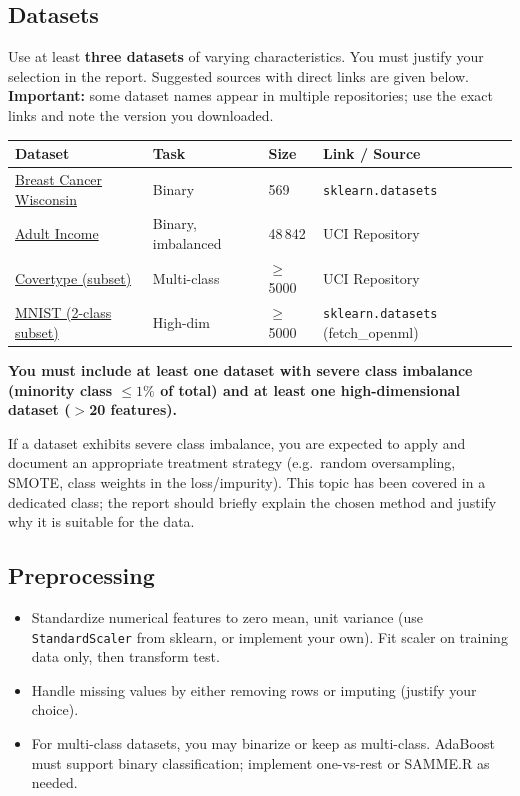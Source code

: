 \documentclass[11pt,a4paper]{article}
\newcommand{\warn}[1]{\textcolor{accent2}{\textbf{#1}}}
\begin{document}
\subsection{Datasets}
Use at least \textbf{three datasets} of varying characteristics. You must justify your selection in the report. Suggested sources with direct links are given below. \textbf{Important:} some dataset names appear in multiple repositories; use the exact links and note the version you downloaded.
\begin{center}\small
\begin{tabular}{llll}
\toprule
\textbf{Dataset} & \textbf{Task} & \textbf{Size} & \textbf{Link / Source} \\
\midrule
\href{https://scikit-learn.org/stable/modules/generated/sklearn.datasets.load_breast_cancer.html}{Breast Cancer Wisconsin} & Binary & 569 & \texttt{sklearn.datasets} \\
\href{https://archive.ics.uci.edu/ml/datasets/adult}{Adult Income} & Binary, imbalanced & 48\,842 & UCI Repository \\
\href{https://archive.ics.uci.edu/ml/datasets/covertype}{Covertype (subset)} & Multi-class & $\geq$5000 & UCI Repository \\
\href{https://scikit-learn.org/stable/modules/generated/sklearn.datasets.fetch_openml.html}{MNIST (2-class subset)} & High-dim & $\geq$5000 & \texttt{sklearn.datasets} (fetch\_openml) \\
\bottomrule
\end{tabular}
\end{center}
\warn{You must include at least one dataset with severe class imbalance (minority class $\le 1\%$ of total) and at least one high-dimensional dataset ($>$20 features).}
\begin{warnbox}
If a dataset exhibits severe class imbalance, you are expected to apply and document an appropriate treatment strategy (e.g.\ random oversampling, SMOTE, class weights in the loss/impurity). This topic has been covered in a dedicated class; the report should briefly explain the chosen method and justify why it is suitable for the data.
\end{warnbox}
\subsection{Preprocessing}
\begin{itemize}
  \item Standardize numerical features to zero mean, unit variance (use \texttt{StandardScaler} from sklearn, or implement your own). Fit scaler on training data only, then transform test.
  \item Handle missing values by either removing rows or imputing (justify your choice).
  \item For multi-class datasets, you may binarize or keep as multi-class. AdaBoost must support binary classification; implement one-vs-rest or SAMME.R as needed.
\end{itemize}
\end{document}
